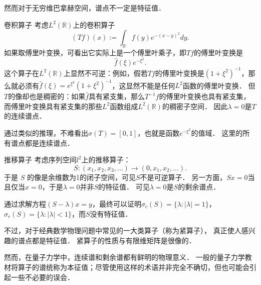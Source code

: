 然而对于无穷维巴拿赫空间，谱点不一定是特征值．

\begin{example}{卷积算子}
考虑$L^2(\mathbb{R})$上的卷积算子
$$
(Tf)(x):=\int_{\mathbb{R}}f(y)e^{-(x-y)^2}dy.
$$
如果取傅里叶变换，可看出它实际上是一个傅里叶乘子，即$Tf$的傅里叶变换是
$$
\hat f(\xi)e^{-\xi^2}.
$$
这个算子在$L^2(\mathbb{R})$上显然不可逆：例如，假若$Tf$的傅里叶变换是$(1+\xi^2)^{-1}$，那么就必须有$\hat f(\xi)=e^{\xi^2}(1+\xi^2)^{-1}$，这显然不能是任何$L^2$函数的傅里叶变换． 但$T$的像却也是稠密的：如果$\hat f$具有紧支集，那么$T^{-1}f$的傅里叶变换也具有紧支集，而傅里叶变换具有紧支集的那些$L^2$函数组成$L^2(\mathbb{R})$的稠密子空间． 因此$\lambda=0$是$T$的连续谱点．

通过类似的推理，不难看出$\sigma(T)=[0,1]$，也就是函数$e^{-\xi^2}$的值域． 这里的所有谱点都是连续谱点．
\end{example}

\begin{example}{推移算子}
考虑序列空间$l^2$上的推移算子：
$$
S:(x_1,x_2,x_3,\dots)\to(0,x_1,x_2,\dots).
$$
于是 $S$ 的像是余维数为1的闭子空间，可见$S$不是可逆算子． 另一方面，$Sx=0$当且仅当$x=0$，于是$\lambda=0$并非$S$的特征值． 可见$\lambda=0$是$S$的剩余谱点．

通过求解方程$(S-\lambda)x=y$，最终可以证明$\sigma_c(S)=\{\lambda:|\lambda|=1\}$，$\sigma_r(S)=\{\lambda:|\lambda|<1\}$，而$S$没有特征值．
\end{example}

不过，对于经典数学物理问题中常见的一大类算子（称为紧算子）， 真正使人感兴趣的谱点都是特征值． 紧算子的性质与有限维矩阵是很像的．

然而，在量子力学中，连续谱和剩余谱都有鲜明的物理意义． 一般的量子力学教材将算子的谱统称为本征值；尽管使用这样的术语并非完全不确切，但也可能会引起一些不必要的误会．

